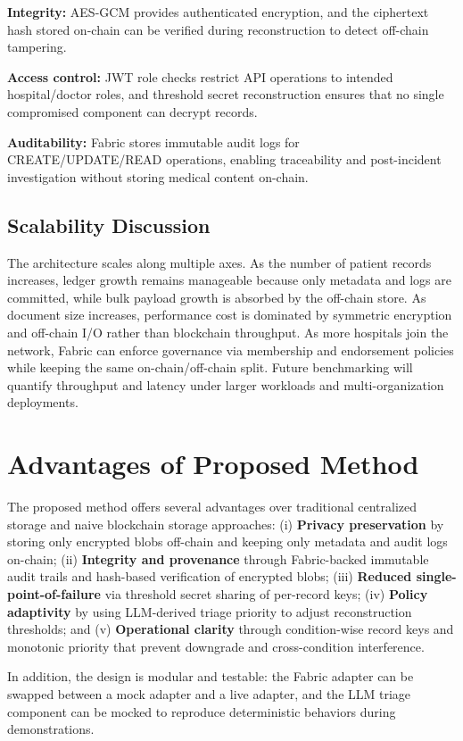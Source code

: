 \documentclass{IEEEtran}
\begin{document}
\textbf{Integrity:} AES-GCM provides authenticated encryption, and the ciphertext hash stored on-chain can be verified during reconstruction to detect off-chain tampering.

\textbf{Access control:} JWT role checks restrict API operations to intended hospital/doctor roles, and threshold secret reconstruction ensures that no single compromised component can decrypt records.

\textbf{Auditability:} Fabric stores immutable audit logs for CREATE/UPDATE/READ operations, enabling traceability and post-incident investigation without storing medical content on-chain.

\subsection{Scalability Discussion}
The architecture scales along multiple axes. As the number of patient records increases, ledger growth remains manageable because only metadata and logs are committed, while bulk payload growth is absorbed by the off-chain store. As document size increases, performance cost is dominated by symmetric encryption and off-chain I/O rather than blockchain throughput. As more hospitals join the network, Fabric can enforce governance via membership and endorsement policies while keeping the same on-chain/off-chain split. Future benchmarking will quantify throughput and latency under larger workloads and multi-organization deployments.

\section{Advantages of Proposed Method}
The proposed method offers several advantages over traditional centralized storage and naive blockchain storage approaches: (i) \textbf{Privacy preservation} by storing only encrypted blobs off-chain and keeping only metadata and audit logs on-chain; (ii) \textbf{Integrity and provenance} through Fabric-backed immutable audit trails and hash-based verification of encrypted blobs; (iii) \textbf{Reduced single-point-of-failure} via threshold secret sharing of per-record keys; (iv) \textbf{Policy adaptivity} by using LLM-derived triage priority to adjust reconstruction thresholds; and (v) \textbf{Operational clarity} through condition-wise record keys and monotonic priority that prevent downgrade and cross-condition interference.

In addition, the design is modular and testable: the Fabric adapter can be swapped between a mock adapter and a live adapter, and the LLM triage component can be mocked to reproduce deterministic behaviors during demonstrations.
\end{document}
